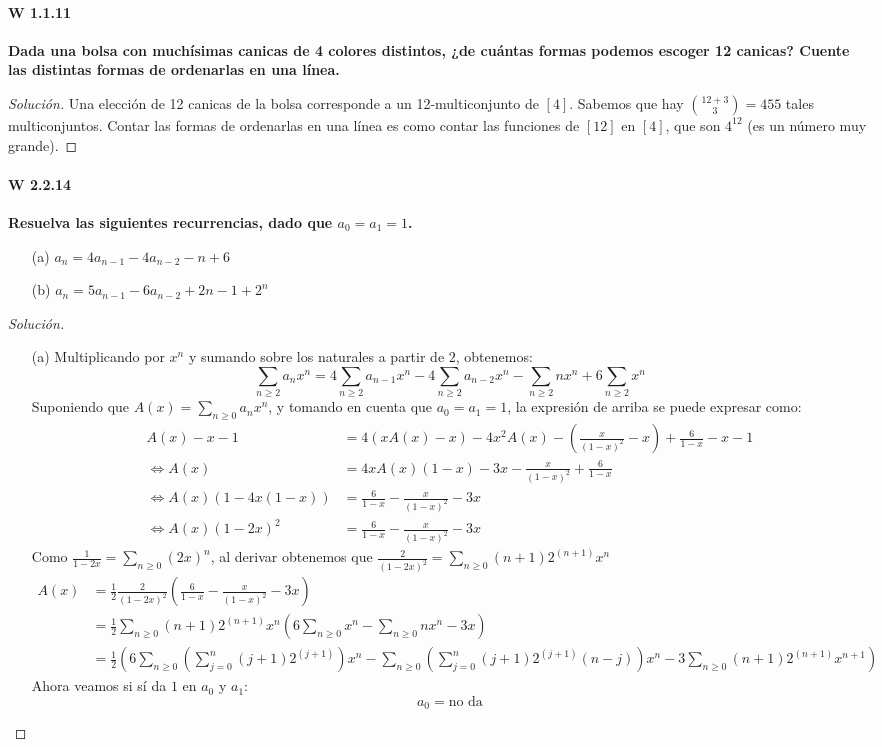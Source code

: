 \documentclass[spanish]{book}
\theoremstyle{definition}
\begin{document}
\paragraph{W 1.1.11}\textbf{Dada una bolsa con muchísimas canicas de 4 colores distintos, ¿de cuántas formas podemos escoger 12 canicas? Cuente las distintas formas de ordenarlas en una línea.}
\begin{proof}[Solución]
	Una elección de 12 canicas de la bolsa corresponde a un 12-multiconjunto de $[4]$. Sabemos que hay ${12+3\choose3}=455$ tales multiconjuntos. Contar las formas de ordenarlas en una línea es como contar las funciones de $[12]$ en $[4]$, que son $4^{12}$ (es un número muy grande).
\end{proof}

\paragraph{W 2.2.14}\textbf{Resuelva las siguientes recurrencias, dado que $a_0=a_1=1$.}
\begin{itemize}
	\item [(a)]$a_n=4a_{n-1}-4a_{n-2}-n+6$
	\item[(b)]$a_n=5a_{n-1}-6a_{n-2}+2n-1+2^n$
\end{itemize}
\begin{proof}[Solución]\leavevmode
\begin{itemize}
\item [(a)] Multiplicando por $x^n$ y sumando sobre los naturales a partir de $2$, obtenemos:
	\[\sum_{n\geq2}a_nx^n=4\sum_{n\geq2}a_{n-1}x^n-4\sum_{n\geq2}a_{n-2}x^n-\sum_{n\geq2}nx^n+6\sum_{n\geq2}x^n\]
Suponiendo que $A(x)=\sum_{n\geq0}a_nx^n$, y tomando en cuenta que $a_0=a_1=1$, la expresión de arriba se puede expresar como:
	\begin{align*}
		A(x)-x-1&=4(xA(x)-x)-4x^2A(x)-\left(\frac{x}{(1-x)^2}-x\right)+\frac{6}{1-x}-x-1\\
		\iff A(x)&=4xA(x)(1-x)-3x-\frac{x}{(1-x)^2}+\frac{6}{1-x}\\
		\iff A(x)(1-4x(1-x))&=\frac{6}{1-x}-\frac{x}{(1-x)^2}-3x\\
		\iff A(x)(1-2x)^2&=\frac{6}{1-x}-\frac{x}{(1-x)^2}-3x
	\end{align*}
Como $\frac{1}{1-2x}=\sum_{n\geq0}(2x)^n$, al derivar obtenemos que $\frac{2}{(1-2x)^2}=\sum_{n\geq0}(n+1)2^{(n+1)}x^{n}$
	\begin{align*}
		A(x)&= \frac{1}{2}\frac{2}{(1-2x)^2}\left(\frac{6}{1-x}-\frac{x}{(1-x)^2}-3x\right)\\
		&=\frac{1}{2}\sum_{n\geq0}(n+1)2^{(n+1)}x^{n}\left(6\sum_{n\geq0}x^n-\sum_{n\geq0}nx^n-3x\right)\\
		&=\frac{1}{2}\left(6\sum_{n\geq0}\left(\sum_{j=0}^n (j+1)2^{(j+1)}\right)x^n-\sum_{n\geq0}\left(\sum_{j=0}^n (j+1)2^{(j+1)}(n-j)\right)x^n-3\sum_{n\geq0}(n+1)2^{(n+1)}x^{n+
		1}\right)
	\end{align*}
Ahora veamos si sí da $1$ en $a_0$ y $a_1$:
\[a_0=\text{no da}\]
\end{itemize}
\end{proof}
\end{document}
